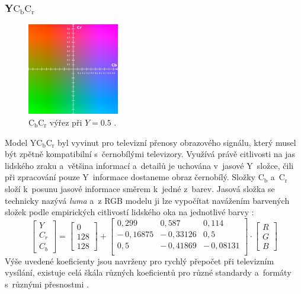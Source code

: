 \documentclass[11pt, a4paper, titlepage]{article}
\begin{document}
\subsubsection{Y$\text{C}_\text{b}\text{C}_\text{r}$}
\begin{figure}
    \centering
    \includegraphics[width=4cm]{YCBCR.png}
    \caption{$\text{C}_\text{b}\text{C}_\text{r}$ výřez při $Y=0.5$ \cite{wiki:YCbCr}.}\label{wrap-fig:1}
\end{figure}
Model Y$\text{C}_\text{b}\text{C}_\text{r}$ byl vyvinut pro televizní přenosy obrazového signálu, který musel být zpětně kompatibilní s~černobílými televizory.
Využívá právě citlivosti na jas lidského zraku a~většina informací a~detailů je uchována v~jasové Y~složce, čili při zpracování pouze Y~informace dostaneme obraz černobílý.
Složky $\text{C}_\text{b}$ a~$\text{C}_\text{r}$ složí k~posunu jasové informace směrem k~jedné z~barev.
Jasová složka se technicky nazývá \emph{luma} a~z RGB modelu ji lze vypočítat navážením
barvených složek podle empirických citlivostí lidského oka na jednotlivé barvy \cite{mul_opora}:
$$
\begin{bmatrix}Y\\C_r\\C_b\end{bmatrix}
=
\begin{bmatrix}0\\128\\128\end{bmatrix}
+
\begin{bmatrix}
    0,\!299 & 0,\!587 & 0,\!114 \\
    -\,0,\!16875 & -\,0,\!33126 & 0,\!5 \\
    0,\!5 & -\,0,\!41869 & -\,0,\!08131 \\
\end{bmatrix}
\cdot
\begin{bmatrix}R\\G\\B\end{bmatrix}
$$
Výše uvedené koeficienty jsou navrženy pro rychlý přepočet při televizním vysílání, existuje celá škála různých koeficientů pro různé standardy a~formáty s~různými přesnostmi \cite{wiki:YCbCr}.
\end{document}
